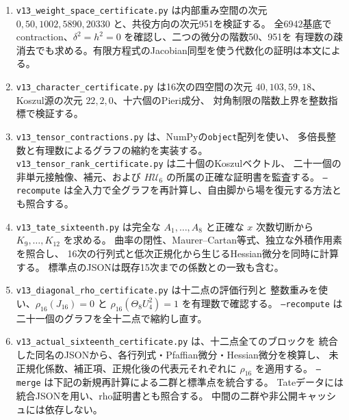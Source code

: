 \documentclass[a4paper,11pt]{ltjsarticle}
\theoremstyle{definition}
\begin{document}
\begin{enumerate}
 \item \texttt{v13\_weight\_space\_certificate.py} は内部重み空間の次元
 $0,50,1002,5890,20330$ と、共役方向の次元951を検証する。
 全6942基底でcontraction、$\delta^2=h^2=0$ を確認し、二つの微分の階数50、951を
 有理数の疎消去でも求める。有限方程式のJacobian同型を使う代数化の証明は本文による。
 \item \texttt{v13\_character\_certificate.py} は16次の四空間の次元
 $40,103,59,18$、Koszul源の次元 $22,2,0$、十六個のPieri成分、
 対角制限の階数上界を整数指標で検証する。
 \item \texttt{v13\_tensor\_contractions.py} は、NumPyの\texttt{object}配列を使い、
 多倍長整数と有理数によるグラフの縮約を実装する。
 \texttt{v13\_tensor\_rank\_certificate.py} は二十個のKoszulベクトル、
 二十一個の非単元接触像、補元、および $H\mathcal U_6$ の所属の正確な証明書を監査する。
 \texttt{--recompute} は全入力で全グラフを再計算し、自由脚から場を復元する方法とも照合する。
 \item \texttt{v13\_tate\_sixteenth.py} は完全な $A_1,\ldots,A_8$ と正確な
 $x$ 次数切断から $K_9,\ldots,K_{12}$ を求める。
 曲率の閉性、Maurer--Cartan等式、独立な外積作用素を照合し、
 16次の行列式と低次正規化から生じるHessian微分を同時に計算する。
 標準点のJSONは既存15次までの係数との一致も含む。
 \item \texttt{v13\_diagonal\_rho\_certificate.py} は十二点の評価行列と
 整数重みを使い、$\rho_{16}(J_{16})=0$ と
 $\rho_{16}(\Theta_8U_4^2)=1$ を有理数で確認する。
 \texttt{--recompute} は二十一個のグラフを全十二点で縮約し直す。
 \item \texttt{v13\_actual\_sixteenth\_certificate.py} は、十二点全てのブロックを
 統合した同名のJSONから、各行列式・Pfaffian微分・Hessian微分を検算し、
 未正規化係数、補正項、正規化後の代表元それぞれに $\rho_{16}$ を適用する。
 \texttt{--merge} は下記の新規再計算による二群と標準点を統合する。
 Tateデータには統合JSONを用い、rho証明書とも照合する。
 中間の二群や非公開キャッシュには依存しない。

\end{enumerate}
\end{document}
